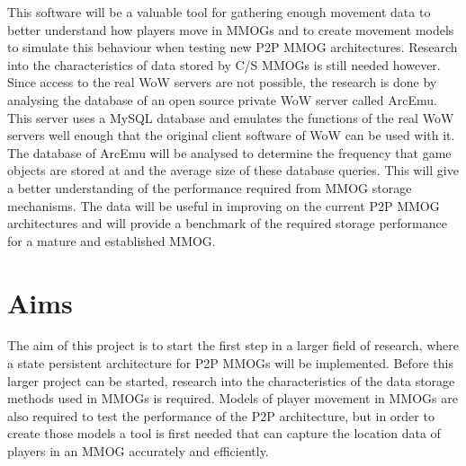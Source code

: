 This software will be a valuable tool for gathering enough movement data to better understand how players move in MMOGs and to create movement models to simulate this behaviour when testing new P2P MMOG architectures. Research into the characteristics of data stored by C/S MMOGs is still needed however. Since access to the real WoW servers are not possible, the research is done by analysing the database of an open source private WoW server called ArcEmu. This server uses a MySQL database and emulates the functions of the real WoW servers well enough that the original client software of WoW can be used with it. The database of ArcEmu will be analysed to determine the frequency that game objects are stored at and the average size of these database queries. This will give a better understanding of the performance required from MMOG storage mechanisms. The data will be useful in improving on the current P2P MMOG architectures and will provide a benchmark of the required storage performance for a mature and established MMOG.


\section{Aims}

The aim of this project is to start the first step in a larger field of research, where a state persistent architecture for P2P MMOGs will be implemented. Before this larger project can be started, research into the characteristics of the data storage methods used in MMOGs is required. Models of player movement in MMOGs are also required to test the performance of the P2P architecture, but in order to create those models a tool is first needed that can capture the location data of players in an MMOG accurately and efficiently. 

